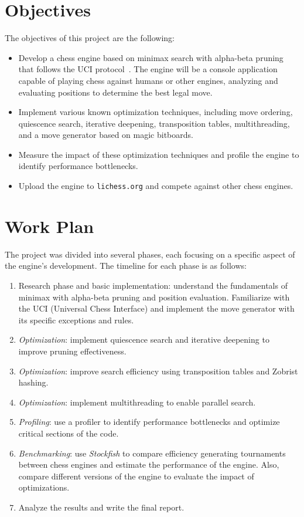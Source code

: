 \newpage

\section{Objectives}\label{sec:objectives}

\noindent The objectives of this project are the following:

\begin{itemize}[itemsep=1pt]
    \item Develop a chess engine based on minimax search with alpha-beta pruning that follows the UCI protocol~\cite{UciProtocol}. The engine will be a console application capable of playing chess against humans or other engines, analyzing and evaluating positions to determine the best legal move.
    \item Implement various known optimization techniques, including move ordering, quiescence search, iterative deepening, transposition tables, multithreading, and a move generator based on magic bitboards.
    \item Measure the impact of these optimization techniques and profile the engine to identify performance bottlenecks.
    \item Upload the engine to \texttt{lichess.org} and compete against other chess engines.
\end{itemize}

\section{Work Plan}

The project was divided into several phases, each focusing on a specific aspect of the engine's development. The timeline for each phase is as follows:

\begin{enumerate}
    \item Research phase and basic implementation: understand the fundamentals of minimax with alpha-beta pruning and position evaluation. Familiarize with the UCI (Universal Chess Interface) and implement the move generator with its specific exceptions and rules.
    \item \textit{Optimization}: implement quiescence search and iterative deepening to improve pruning effectiveness.
    \item \textit{Optimization}: improve search efficiency using transposition tables and Zobrist hashing.
    \item \textit{Optimization}: implement multithreading to enable parallel search.
    \item \textit{Profiling}: use a profiler to identify performance bottlenecks and optimize critical sections of the code.
    \item \textit{Benchmarking}: use \textit{Stockfish} to compare efficiency generating tournaments between chess engines and estimate the performance of the engine. Also, compare different versions of the engine to evaluate the impact of optimizations.
    \item Analyze the results and write the final report.
\end{enumerate}

